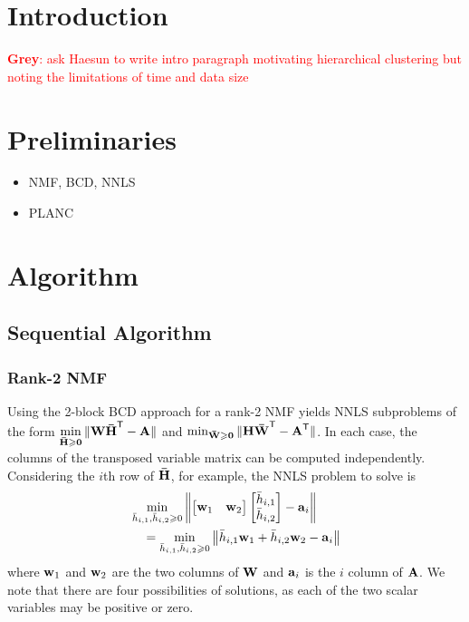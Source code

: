 \documentclass[conference,compsoc]{IEEEtran}
\newcommand{\GB}[1]{\textcolor{red}{\textbf{Grey}: #1}}
\begin{document}

\section{Introduction}

\GB{ask Haesun to write intro paragraph motivating hierarchical clustering but noting the limitations of time and data size}

\section{Preliminaries}
\label{sec:prelim}

\begin{itemize}
	\item NMF, BCD, NNLS
	\item PLANC
\end{itemize}

\section{Algorithm}

\subsection{Sequential Algorithm}

\subsubsection{Rank-2 NMF}

Using the 2-block BCD approach for a rank-2 NMF yields NNLS subproblems of the form $\displaystyle \min_{\M[\bar]{H} \geq \M{0}} \|\M{W}\M[\bar]{H}^\Tra-\M{A}\|$ and $\min_{\M[\bar]{W} \geq \M{0}} \|\M{H}\M[\bar]{W}^\Tra-\M{A}^\Tra\|$.
In each case, the columns of the transposed variable matrix can be computed independently.
Considering the $i$th row of $\M[\bar]{H}$, for example, the NNLS problem to solve is
\begin{align*}
\begin{multlined}
\min_{\ME[\bar]{H}{i,1},\ME[\bar]{H}{i,2} \geq 0} \left\|\begin{bmatrix} \V{w}_1 & \V{w}_2 \end{bmatrix} \begin{bmatrix}\ME[\bar]{H}{i,1} \\ \ME[\bar]{H}{i,2} \end{bmatrix} - \V{A}_i \right\| \\ = \min_{\ME[\bar]{H}{i,1},\ME[\bar]{H}{i,2} \geq 0} \left\|\ME[\bar]{H}{i,1} \V{w}_1 + \ME[\bar]{H}{i,2} \V{w}_2 - \V{a}_i \right\|
\end{multlined}
\end{align*}
where $\V{w}_1$ and $\V{W}_2$ are the two columns of $\M{W}$ and $\V{a}_i$ is the $i$ column of $\M{A}$.
We note that there are four possibilities of solutions, as each of the two scalar variables may be positive or zero.
\end{document}

